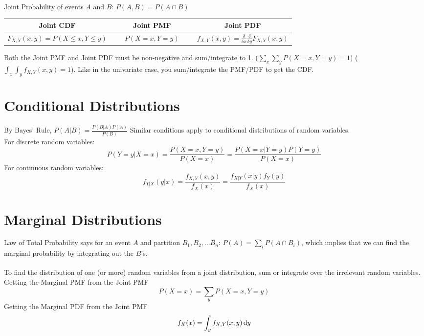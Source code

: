 \documentclass[11.5pt]{article}
\begin{document}
\begin{notes}
Joint Probability of events $A$ and $B$: $P(A,B) = P(A \cap B)$

\begin{table}[h]\begin{center}
	\begin{tabular}{ccccc} \toprule
		\textbf{Joint CDF} & ~ & \textbf{Joint PMF} & ~ & \textbf{Joint PDF} \\  \midrule
		$F_{X, Y}(x, y) = P(X \leq x,Y \leq y)$ & ~ & $P(X=x, Y=y)$ & ~ & $f_{X,Y}(x,y) = \frac{\delta}{\delta x} \frac{\delta}{\delta y}F_{X, Y}(x, y)$ \\ \bottomrule
	\end{tabular}\end{center}
\end{table}

Both the Joint PMF and Joint PDF must be non-negative and sum/integrate to 1. ($\sum_x \sum_y P(X=x, Y=y) = 1$) ($\int_x\int_y f_{X,Y}(x,y) = 1$). Like in the univariate case, you sum/integrate the PMF/PDF to get the CDF.

\section*{Conditional Distributions}
By Bayes' Rule, $P(A|B) = \frac{P(B|A)P(A)}{P(B)}$ Similar conditions apply to conditional distributions of random variables.\\

For discrete random variables:
\[P(Y=y|X=x) = \frac{P(X=x, Y=y)}{P(X=x)} = \frac{P(X=x|Y=y)P(Y=y)}{P(X=x)}\]
For continuous random variables:
\[f_{Y|X}(y|x) = \frac{f_{X,Y}(x, y)}{f_X(x)} = \frac{f_{X|Y}(x|y)f_Y(y)}{f_X(x)}\]

\section*{Marginal Distributions}
Law of Total Probability says for an event $A$ and partition $B_1, B_2, ... B_n$: $P(A) = \sum_i P(A\cap B_i)$, which implies that we can find the marginal probability by integrating out the $B$'s.  \\ \\
To find the distribution of one (or more) random variables from a joint distribution, sum or integrate over the irrelevant random variables. \\

Getting the Marginal PMF from the Joint PMF
$$P(X = x) = \sum_y P(X=x, Y=y)$$
Getting the Marginal PDF from the Joint PMF
$$f_X(x) = \int_y f_{X, Y}(x, y) \mathop{}\!\mathrm{d} y$$




\end{notes}
\end{document}
